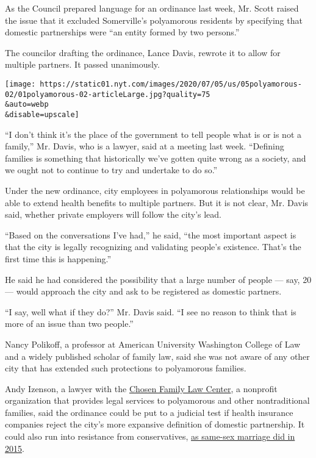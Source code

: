 As the Council prepared language for an ordinance last week, Mr. Scott
raised the issue that it excluded Somerville's polyamorous residents by
specifying that domestic partnerships were ``an entity formed by two
persons.''

The councilor drafting the ordinance, Lance Davis, rewrote it to allow
for multiple partners. It passed unanimously.

\texttt{[image: https://static01.nyt.com/images/2020/07/05/us/05polyamorous-02/01polyamorous-02-articleLarge.jpg?quality=75\\\&auto=webp\\\&disable=upscale]}

``I don't think it's the place of the government to tell people what is
or is not a family,'' Mr. Davis, who is a lawyer, said at a meeting last
week. ``Defining families is something that historically we've gotten
quite wrong as a society, and we ought not to continue to try and
undertake to do so.''

Under the new ordinance, city employees in polyamorous relationships
would be able to extend health benefits to multiple partners. But it is
not clear, Mr. Davis said, whether private employers will follow the
city's lead.

``Based on the conversations I've had,'' he said, ``the most important
aspect is that the city is legally recognizing and validating people's
existence. That's the first time this is happening.''

He said he had considered the possibility that a large number of people
--- say, 20 --- would approach the city and ask to be registered as
domestic partners.

``I say, well what if they do?'' Mr. Davis said. ``I see no reason to
think that is more of an issue than two people.''

Nancy Polikoff, a professor at American University Washington College of
Law and a widely published scholar of family law, said she was not aware
of any other city that has extended such protections to polyamorous
families.

Andy Izenson, a lawyer with the
\href{https://chosenfamilylawcenter.org/}{Chosen Family Law Center}, a
nonprofit organization that provides legal services to polyamorous and
other nontraditional families, said the ordinance could be put to a
judicial test if health insurance companies reject the city's more
expansive definition of domestic partnership. It could also run into
resistance from conservatives,
\href{https://www.nytimes.com/2015/06/27/us/supreme-court-same-sex-marriage.html}{as
same-sex marriage did in 2015}.

